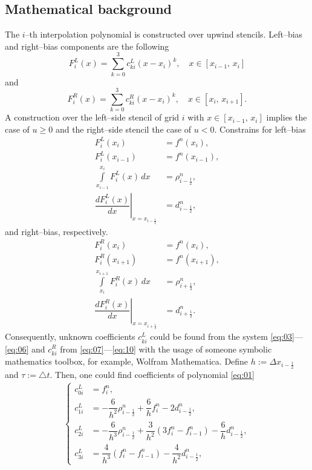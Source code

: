 \documentclass[10pt,a4paper]{article}
\begin{document}
\subsection{Mathematical background}
The $i$--th interpolation polynomial is constructed over upwind stencils. Left--bias
and right--bias components are the following
\begin{equation}\label{eq:01}
F_i^L(x) = \sum\limits_{k=0}^{3} c_{ki}^L(x-x_i)^k, \quad x\in[x_{i-1},\,x_i]
\end{equation}
and
\begin{equation}\label{eq:02}
F_i^R(x) = \sum\limits_{k=0}^{3} c_{ki}^R(x-x_i)^k, \quad x\in[x_{i},\,x_{i+1}].
\end{equation}
A construction over the left--side stencil of grid $i$ with $x\in[x_{i-1},\,x_i]$
implies the case of $u\geqslant0$ and the right--side stencil the case of $u<0$. Constrains for left--bias
\begin{align}
  F_i^L(x_i) &= f^n(x_i), \label{eq:03}\\
  F_i^L(x_{i-1}) &= f^n(x_{i-1}), \label{eq:04}\\
  \int\limits_{x_{i-1}}^{x_i} F_i^L(x)\,dx &= \rho_{i-\frac{1}{2}}^n, \label{eq:05}\\
  \left.\dfrac{dF_i^L(x)}{dx}\right|_{x=x_{i-\frac{1}{2}}} &= d_{i-\frac{1}{2}}^n, \label{eq:06}
\end{align}
and right--bias, respectively.
\begin{align}
  F_i^R(x_i) &= f^n(x_i), \label{eq:07}\\
  F_i^R(x_{i+1}) &= f^n(x_{i+1}), \label{eq:08}\\
  \int\limits_{x_{i}}^{x_{i+1}} F_i^R(x)\,dx &= \rho_{i+\frac{1}{2}}^n, \label{eq:09}\\
  \left.\dfrac{dF_i^R(x)}{dx}\right|_{x=x_{i+\frac{1}{2}}} &= d_{i+\frac{1}{2}}^n. \label{eq:10}
\end{align}  
Consequently, unknown coefficients $c_{ki}^L$ could be found from the system \eqref{eq:03}---\eqref{eq:06} and $c_{ki}^R$ from \eqref{eq:07}---\eqref{eq:10} with
the usage of someone symbolic mathematics toolbox, for example, Wolfram Mathematica.
Define $h := \Delta x_{i-\frac{1}{2}}$ and $\tau := \triangle t$. Then, one could find coefficients of polynomial \eqref{eq:01}
\begin{align}\label{eq:11}
  \begin{cases}
   c_{0i}^L &= f_i^n, \\
   c_{1i}^L &= -\dfrac{6}{h^2}\rho_{i-\frac{1}{2}}^n + \dfrac{6}{h}f_i^n - 2d_{i-\frac{1}{2}}^n,\\
   c_{2i}^L &= -\dfrac{6}{h^3}\rho_{i-\frac{1}{2}}^n + \dfrac{3}{h^2}(3f_i^n-f_{i-1}^n) - \dfrac{6}{h}d_{i-\frac{1}{2}}^n, \\
   c_{3i}^L &= \dfrac{4}{h^3}(f_i^n-f_{i-1}^n) - \dfrac{4}{h^2}d_{i-\frac{1}{2}}^n,
  \end{cases}  
\end{align}
\end{document}
